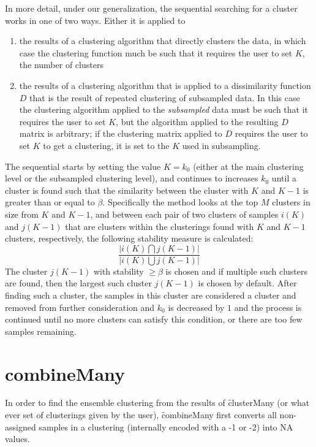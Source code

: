 In more detail, under our generalization, the sequential searching for a cluster works in one of two ways. Either it is applied to 
\begin{enumerate}\item the results of a clustering algorithm that directly clusters the data, in which case the clustering function much be such that it requires the user to set $K$, the number of clusters \item the results of a clustering algorithm that is applied to a dissimilarity function $D$ that is the result of repeated clustering of subsampled data. In this case the clustering algorithm applied to the \emph{subsampled} data must be such that it requires the user to set $K$, but the algorithm applied to the resulting $D$ matrix is arbitrary; if the clustering matrix applied to $D$ requires the user to set $K$ to get a clustering, it is set to the $K$ used in subsampling.  \end{enumerate} 
The sequential starts by setting the value $K=k_0$ (either at the main clustering level or the subsampled clustering level), and continues to increases $k_0$ until a cluster is found such that the similarity between the cluster with $K$ and $K-1$ is greater than or equal to $\beta$. Specifically the method looks at the top $M$ clusters in size from $K$ and $K-1$, and between each pair of two clusters of samples $i(K)$ and $j(K-1)$ that are clusters within the clusterings found with $K$ and $K-1$ clusters, respectively, the following stability measure is calculated:
$$ \frac{|i(K)\bigcap j(K-1)|}{|i(K)\bigcup j(K-1)|}$$
The cluster $j(K-1)$ with stability $ \geq \beta$ is chosen and if multiple such clusters are found, then the largest such cluster $j(K-1)$ is chosen by default. After finding such a cluster, the samples in this cluster are considered a cluster and removed from further consideration and $k_0$ is decreased by $1$ and the process is continued until no more clusters can satisfy this condition, or there are too few samples remaining. 


\section{combineMany}

In order to find the ensemble clustering from the results of \f{clusterMany} (or what ever set of clusterings given by the user), \f{combineMany} first converts all non-assigned samples in a clustering (internally encoded with a -1 or -2) into NA values. 

